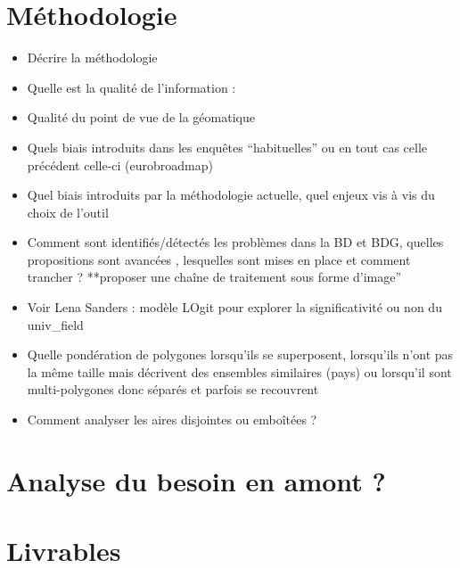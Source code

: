 \documentclass[
  12pt,
  a4paper,
]{scrbook}
\providecommand{\tightlist}{%
  \setlength{\itemsep}{0pt}\setlength{\parskip}{0pt}}\usepackage{longtable,booktabs,array}
\begin{document}
\hypertarget{muxe9thodologie}{%
\section*{Méthodologie}\label{muxe9thodologie}}

\begin{itemize}
\tightlist
\item
  Décrire la méthodologie
\item
  Quelle est la qualité de l'information :
\item
  Qualité du point de vue de la géomatique
\item
  Quels biais introduits dans les enquêtes ``habituelles'' ou en tout
  cas celle précédent celle-ci (eurobroadmap)
\item
  Quel biais introduits par la méthodologie actuelle, quel enjeux vis à
  vis du choix de l'outil
\item
  Comment sont identifiés/détectés les problèmes dans la BD et BDG,
  quelles propositions sont avancées , lesquelles sont mises en place et
  comment trancher ? **proposer une chaîne de traitement sous forme
  d'image''
\item
  Voir Lena Sanders : modèle LOgit pour explorer la significativité ou
  non du univ\_field
\item
  Quelle pondération de polygones lorsqu'ils se superposent, lorsqu'ils
  n'ont pas la même taille mais décrivent des ensembles similaires
  (pays) ou lorsqu'il sont multi-polygones donc séparés et parfois se
  recouvrent
\item
  Comment analyser les aires disjointes ou emboîtées ?
\end{itemize}

\hypertarget{analyse-du-besoin-en-amont}{%
\section*{Analyse du besoin en amont
?}\label{analyse-du-besoin-en-amont}}

\hypertarget{livrables}{%
\section*{Livrables}\label{livrables}}
\end{document}
